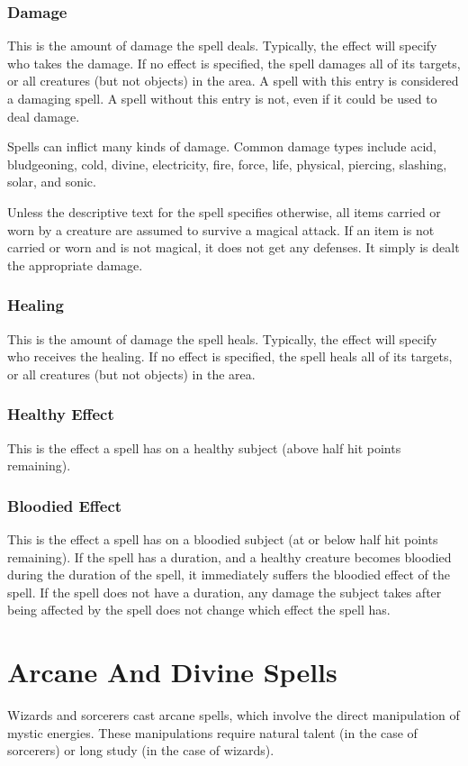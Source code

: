 \subsubsection{Damage}
This is the amount of damage the spell deals. Typically, the effect will specify who takes the damage. If no effect is specified, the spell damages all of its targets, or all creatures (but not objects) in the area. A spell with this entry is considered a damaging spell. A spell without this entry is not, even if it could be used to deal damage.

Spells can inflict many kinds of damage. Common damage types include acid, bludgeoning, cold, divine, electricity, fire, force, life, physical, piercing, slashing, solar, and sonic.

 Unless the descriptive text for the spell specifies otherwise, all items carried or worn by a creature are assumed to survive a magical attack. If an item is not carried or worn and is not magical, it does not get any defenses. It simply is dealt the appropriate damage.

\subsubsection{Healing}
This is the amount of damage the spell heals. Typically, the effect will specify who receives the healing. If no effect is specified, the spell heals all of its targets, or all creatures (but not objects) in the area.

\subsubsection{Healthy Effect}
This is the effect a spell has on a healthy subject (above half hit points remaining).

\subsubsection{Bloodied Effect}
This is the effect a spell has on a bloodied subject (at or below half hit points remaining). If the spell has a duration, and a healthy creature becomes bloodied during the duration of the spell, it immediately suffers the bloodied effect of the spell. If the spell does not have a duration, any damage the subject takes after being affected by the spell does not change which effect the spell has.

\section{Arcane And Divine Spells}
Wizards and sorcerers cast arcane spells, which involve the direct manipulation of mystic energies. These manipulations require natural talent (in the case of sorcerers) or long study (in the case of wizards).


